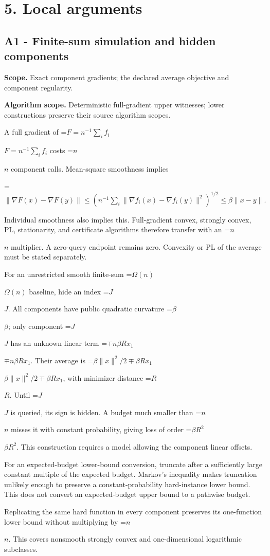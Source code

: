 \documentclass[10pt,a4paper]{article}
\newcommand{\AtlasMath}[1]{\par\begingroup\centering\setbox0=\hbox{$\displaystyle #1$}\ifdim\wd0>1.4\linewidth\typeout{ATLAS WIDE FORMULA: \the\wd0}\fi\ifdim\wd0>\linewidth\resizebox{\linewidth}{!}{\box0}\else\box0\fi\par\endgroup}
\newcommand{\AtlasInlineMath}[1]{\begingroup\setbox0=\hbox{$#1$}\ifdim\wd0>.4\linewidth\endgroup\AtlasMath{#1}\else\endgroup$#1$\fi}
\begin{document}
\section{5. Local arguments}
\subsection{A1 - Finite-sum simulation and hidden components}
\textbf{Scope.} Exact component gradients; the declared average objective and component regularity.

\textbf{Algorithm scope.} Deterministic full-gradient upper witnesses; lower constructions preserve their source algorithm scopes.

A full gradient of \AtlasInlineMath{F=n^{-1}\sum_i f_i} costs \AtlasInlineMath{n} component calls. Mean-square smoothness implies

\AtlasMath{\|\nabla F(x)-\nabla F(y)\|
\le(n^{-1}\sum_i\|\nabla f_i(x)-\nabla f_i(y)\|^2)^{1/2}
\le\beta\|x-y\|.}

Individual smoothness also implies this. Full-gradient convex, strongly convex, PL, stationarity, and certificate algorithms therefore transfer with an \AtlasInlineMath{n} multiplier. A zero-query endpoint remains zero. Convexity or PL of the average must be stated separately.

For an unrestricted smooth finite-sum \AtlasInlineMath{\Omega(n)} baseline, hide an index \AtlasInlineMath{J}. All components have public quadratic curvature \AtlasInlineMath{\beta}; only component \AtlasInlineMath{J} has an unknown linear term \AtlasInlineMath{\mp n\beta R x_1}. Their average is
\AtlasInlineMath{\beta\|x\|^2/2\mp\beta Rx_1}, with minimizer distance \AtlasInlineMath{R}. Until \AtlasInlineMath{J} is queried, its sign is hidden. A budget much smaller than \AtlasInlineMath{n} misses it with constant probability, giving loss of order \AtlasInlineMath{\beta R^2}. This construction requires a model allowing the component linear offsets.

For an expected-budget lower-bound conversion, truncate after a sufficiently large constant multiple of the expected budget. Markov's inequality makes truncation unlikely enough to preserve a constant-probability hard-instance lower bound. This does not convert an expected-budget upper bound to a pathwise budget.

Replicating the same hard function in every component preserves its one-function lower bound without multiplying by \AtlasInlineMath{n}. This covers nonsmooth strongly convex and one-dimensional logarithmic subclasses.
\end{document}
